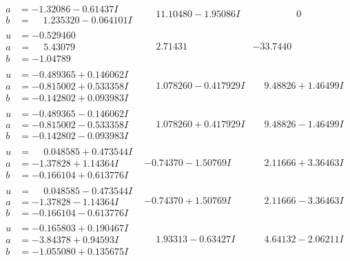 \documentclass[1p]{elsarticle_modified}
\theoremstyle{definition}
\begin{document}
$$\begin{array}{c|c|c}
\begin{aligned}
a &= -1.32086 - 0.61437 I \\
b &= \phantom{-}1.235320 - 0.064101 I\end{aligned}
 & \phantom{-}11.10480 - 1.95086 I & \phantom{-0.000000 } 0 \\ \hline\begin{aligned}
u &= -0.529460\phantom{ +0.000000I} \\
a &= \phantom{-}5.43079\phantom{ +0.000000I} \\
b &= -1.04789\phantom{ +0.000000I}\end{aligned}
 & \phantom{-}2.71431\phantom{ +0.000000I} & -33.7440\phantom{ +0.000000I} \\ \hline\begin{aligned}
u &= -0.489365 + 0.146062 I \\
a &= -0.815002 + 0.533358 I \\
b &= -0.142802 + 0.093983 I\end{aligned}
 & \phantom{-}1.078260 - 0.417929 I & \phantom{-}9.48826 + 1.46499 I \\ \hline\begin{aligned}
u &= -0.489365 - 0.146062 I \\
a &= -0.815002 - 0.533358 I \\
b &= -0.142802 - 0.093983 I\end{aligned}
 & \phantom{-}1.078260 + 0.417929 I & \phantom{-}9.48826 - 1.46499 I \\ \hline\begin{aligned}
u &= \phantom{-}0.048585 + 0.473544 I \\
a &= -1.37828 + 1.14364 I \\
b &= -0.166104 + 0.613776 I\end{aligned}
 & -0.74370 - 1.50769 I & \phantom{-}2.11666 + 3.36463 I \\ \hline\begin{aligned}
u &= \phantom{-}0.048585 - 0.473544 I \\
a &= -1.37828 - 1.14364 I \\
b &= -0.166104 - 0.613776 I\end{aligned}
 & -0.74370 + 1.50769 I & \phantom{-}2.11666 - 3.36463 I \\ \hline\begin{aligned}
u &= -0.165803 + 0.190467 I \\
a &= -3.84378 + 0.94593 I \\
b &= -1.055080 + 0.135675 I\end{aligned}
 & \phantom{-}1.93313 - 0.63427 I & \phantom{-}4.64132 - 2.06211 I\\

\end{array}$$
\end{document}
